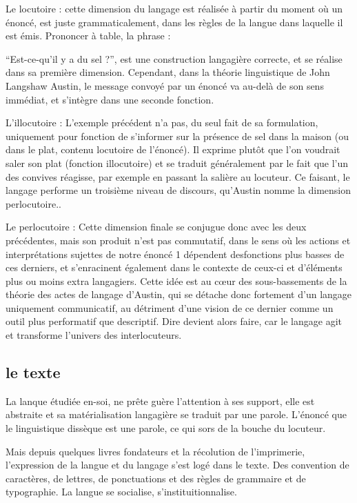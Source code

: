 \documentclass[
  letterpaper,
  DIV=11,
  numbers=noendperiod]{scrreprt}
\begin{document}
Le locutoire : cette dimension du langage est réalisée à partir du
moment où un énoncé, est juste grammaticalement, dans les règles de la
langue dans laquelle il est émis. Prononcer à table, la phrase :

``Est-ce-qu'il y a du sel ?'', est une construction langagière correcte,
et se réalise dans sa première dimension. Cependant, dans la théorie
linguistique de John Langshaw Austin, le message convoyé par un énoncé
va au-delà de son sens immédiat, et s'intègre dans une seconde fonction.

L'illocutoire : L'exemple précédent n'a pas, du seul fait de sa
formulation, uniquement pour fonction de s'informer sur la présence de
sel dans la maison (ou dans le plat, contenu locutoire de l'énoncé). Il
exprime plutôt que l'on voudrait saler son plat (fonction illocutoire)
et se traduit généralement par le fait que l'un des convives réagisse,
par exemple en passant la salière au locuteur. Ce faisant, le langage
performe un troisième niveau de discours, qu'Austin nomme la dimension
perlocutoire..

Le perlocutoire : Cette dimension finale se conjugue donc avec les deux
précédentes, mais son produit n'est pas commutatif, dans le sens où les
actions et interprétations sujettes de notre énoncé 1 dépendent
desfonctions plus basses de ces derniers, et s'enracinent également dans
le contexte de ceux-ci et d'éléments plus ou moins extra langagiers.
Cette idée est au cœur des sous-bassements de la théorie des actes de
langage d'Austin, qui se détache donc fortement d'un langage uniquement
communicatif, au détriment d'une vision de ce dernier comme un outil
plus performatif que descriptif. Dire devient alors faire, car le
langage agit et transforme l'univers des interlocuteurs.

\subsection{le texte}\label{le-texte}

La lanque étudiée en-soi, ne prête guère l'attention à ses support, elle
est abstraite et sa matérialisation langagière se traduit par une
parole. L'énoncé que le linguistique dissèque est une parole, ce qui
sors de la bouche du locuteur.

Mais depuis quelques livres fondateurs et la récolution de l'imprimerie,
l'expression de la langue et du langage s'est logé dans le texte. Des
convention de caractères, de lettres, de ponctuations et des règles de
grammaire et de typographie. La langue se socialise,
s'instituitionnalise.
\end{document}
